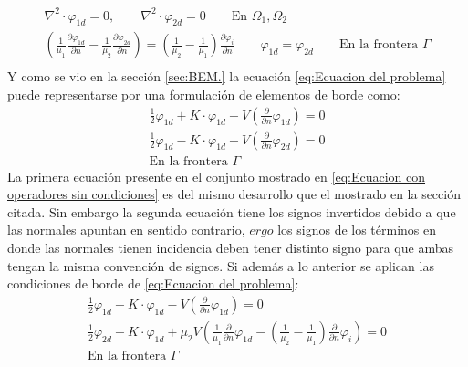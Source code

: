 \begin{equation}
\label{eq:Ecuacion del problema}
\boxed{
\begin{gathered}
\nabla^2\cdot \varphi_{1d}=0,\qquad\nabla^2\cdot \varphi_{2d}=0\qquad\text{En }\Omega_1,\Omega_2\\
\left(\frac{1}{\mu_1}\frac{\partial \varphi_{1d}}{\partial n}-\frac{1}{\mu_2}\frac{\partial \varphi_{2d}}{\partial n}\right)=\left(\frac{1}{\mu_2}-\frac{1}{\mu_1}\right)\frac{\partial \varphi_{i}}{\partial n}\qquad\varphi_{1d}=\varphi_{2d}\qquad\text{En la frontera }\Gamma\\
\end{gathered}
}
\end{equation}
Y como se vio en la sección \ref{sec:BEM.} la ecuación \eqref{eq:Ecuacion del problema} puede representarse por una formulación de elementos de borde como:
\begin{equation}
\label{eq:Ecuacion con operadores sin condiciones}
\begin{gathered}
\frac{1}{2}\varphi_{1d}+K\cdot\varphi_{1d}-V\left(\frac{\partial}{\partial n}\varphi_{1d}\right)=0\\
\frac{1}{2}\varphi_{1d}-K\cdot\varphi_{1d}+V\left(\frac{\partial}{\partial n}\varphi_{2d}\right)=0\\
\text{En la frontera }\Gamma
\end{gathered}
\end{equation}
La primera ecuación presente en el conjunto mostrado en \eqref{eq:Ecuacion con operadores sin condiciones} es del mismo desarrollo que el mostrado en la sección citada. Sin embargo la segunda ecuación tiene los signos invertidos debido a que las normales apuntan en sentido contrario, $ergo$ los signos de los términos en donde las normales tienen incidencia deben tener distinto signo para que ambas tengan la misma convención de signos. Si además a lo anterior se aplican las condiciones de borde de \eqref{eq:Ecuacion del problema}:
\begin{equation}
\label{eq:Ecuacion de borde con condiciones de borde}
\begin{gathered}
\frac{1}{2}\varphi_{1d}+K\cdot\varphi_{1d}-V\left(\frac{\partial}{\partial n}\varphi_{1d}\right)=0\\
\frac{1}{2}\varphi_{2d}-K\cdot\varphi_{1d}+\mu_2 V\left(\frac{1}{\mu_1}\frac{\partial}{\partial n}\varphi_{1d}-\left(\frac{1}{\mu_2}-\frac{1}{\mu_1}\right)\frac{\partial}{\partial n}\varphi_{i}\right)=0\\
\text{En la frontera }\Gamma
\end{gathered}
\end{equation}
